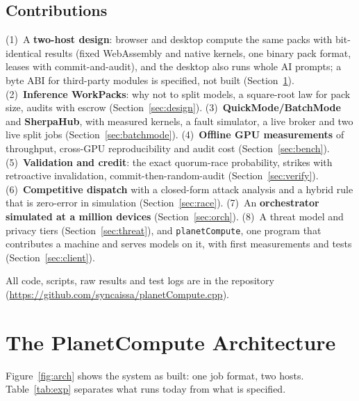 \documentclass[11pt,a4paper]{article}
\newcommand{\coderepo}{https://github.com/syncaissa/planetCompute.cpp}
\theoremstyle{definition}
\theoremstyle{plain}
\begin{document}
\subsection{Contributions}
(1)~A \textbf{two-host design}: browser and desktop compute the same packs with bit-identical results (fixed
WebAssembly and native kernels, one binary pack format, leases with commit-and-audit), and the desktop also runs
whole AI prompts; a byte ABI for third-party modules is specified, not built (Section~\ref{sec:arch}).
(2)~\textbf{Inference WorkPacks}: why not to split models, a square-root law for pack size, audits with escrow
(Section~\ref{sec:design}). (3)~\textbf{QuickMode/BatchMode} and \textbf{SherpaHub}, with measured kernels, a
fault simulator, a live broker and two live split jobs (Section~\ref{sec:batchmode}). (4)~\textbf{Offline GPU
measurements} of throughput, cross-GPU reproducibility and audit cost (Section~\ref{sec:bench}).
(5)~\textbf{Validation and credit}: the exact quorum-race probability, strikes with retroactive invalidation,
commit-then-random-audit (Section~\ref{sec:verify}). (6)~\textbf{Competitive dispatch} with a closed-form attack
analysis and a hybrid rule that is zero-error in simulation (Section~\ref{sec:race}). (7)~An
\textbf{orchestrator simulated at a million devices} (Section~\ref{sec:orch}). (8)~A threat model and privacy
tiers (Section~\ref{sec:threat}), and \texttt{planetCompute}, one program that contributes a machine and serves
models on it, with first measurements and tests (Section~\ref{sec:client}).

\noindent All code, scripts, raw results and test logs are in the repository (\url{\coderepo}).

\section{The PlanetCompute Architecture}\label{sec:arch}

Figure~\ref{fig:arch} shows the system as built: one job format, two hosts. Table~\ref{tab:exp}
separates what runs today from what is specified.
\end{document}
